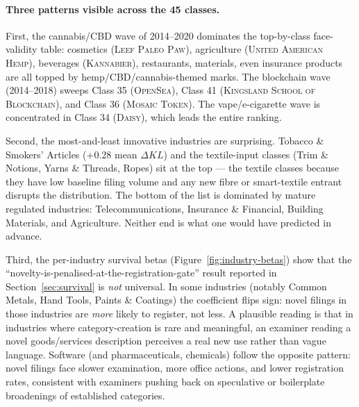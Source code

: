 \documentclass[11pt]{article}
\begin{document}
\begin{table}[h]
\centering
\caption{Top-1 highest-$\Delta KL$ mark per industry, 2010--2020
cohort. The 2014--2020 cannabis/CBD/blockchain wave appears in nearly
every consumer-goods class.}
\label{tab:industry-fv}
\scriptsize

\end{table}

\paragraph{Three patterns visible across the 45 classes.}

First, the cannabis/CBD wave of 2014--2020 dominates the top-by-class
face-validity table: cosmetics (\textsc{Leef Paleo Paw}), agriculture
(\textsc{United American Hemp}), beverages (\textsc{Kannabier}),
restaurants, materials, even insurance products are all topped by
hemp/CBD/cannabis-themed marks. The blockchain wave (2014--2018)
sweeps Class 35 (\textsc{OpenSea}), Class 41
(\textsc{Kingsland School of Blockchain}), and Class 36
(\textsc{Mosaic Token}). The vape/e-cigarette wave is concentrated in
Class 34 (\textsc{Daisy}), which leads the entire ranking.

Second, the most-and-least innovative industries are surprising.
Tobacco \& Smokers' Articles ($+0.28$ mean $\Delta KL$) and the
textile-input classes (Trim \& Notions, Yarns \& Threads, Ropes)
sit at the top --- the textile classes because they have low baseline
filing volume and any new fibre or smart-textile entrant disrupts the
distribution. The bottom of the list is dominated by mature regulated
industries: Telecommunications, Insurance \& Financial, Building
Materials, and Agriculture. Neither end is what one would have
predicted in advance.

Third, the per-industry survival betas
(Figure~\ref{fig:industry-betas}) show that the
``novelty-is-penalised-at-the-registration-gate'' result reported in
Section~\ref{sec:survival} is \emph{not} universal. In some industries
(notably Common Metals, Hand Tools, Paints \& Coatings) the
coefficient flips sign: novel filings in those industries are
\emph{more} likely to register, not less. A plausible reading is that
in industries where category-creation is rare and meaningful, an
examiner reading a novel goods/services description perceives a real
new use rather than vague language. Software (and pharmaceuticals,
chemicals) follow the opposite pattern: novel filings face slower
examination, more office actions, and lower registration rates,
consistent with examiners pushing back on speculative or boilerplate
broadenings of established categories.
\end{document}
